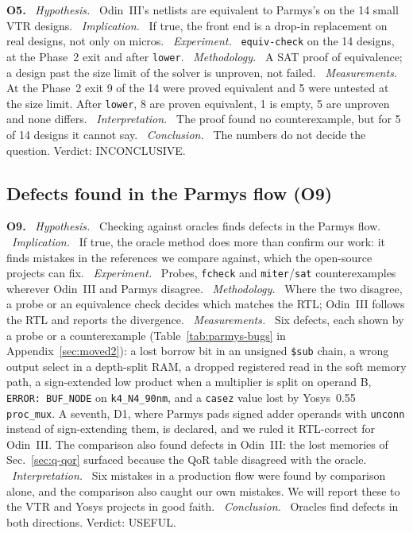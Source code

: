 \documentclass[conference]{IEEEtran}
\newcommand{\code}[1]{\texttt{#1}}
\newcommand{\argid}[1]{\par\smallskip\noindent\textbf{#1.}}
\newcommand{\ah}[1]{\ \textit{#1.}\ }
\begin{document}
\argid{O5}
\ah{Hypothesis} Odin~III's netlists are equivalent to Parmys's on the 14 small VTR designs.
\ah{Implication} If true, the front end is a drop-in replacement on real designs, not only on micros.
\ah{Experiment} \code{equiv-check} on the 14 designs, at the Phase~2 exit and after \code{lower}.
\ah{Methodology} A SAT proof of equivalence; a design past the size limit of the solver is unproven, not failed.
\ah{Measurements} At the Phase~2 exit 9 of the 14 were proved equivalent and 5 were untested at the size limit. After \code{lower}, 8 are proven equivalent, 1 is empty, 5 are unproven and none differs.
\ah{Interpretation} The proof found no counterexample, but for 5 of 14 designs it cannot say.
\ah{Conclusion} The numbers do not decide the question. Verdict: INCONCLUSIVE.

\subsection{Defects found in the Parmys flow (O9)}
\label{sec:parmys-bugs}

\argid{O9}
\ah{Hypothesis} Checking against oracles finds defects in the Parmys flow.
\ah{Implication} If true, the oracle method does more than confirm our work: it finds mistakes in the references we compare against, which the open-source projects can fix.
\ah{Experiment} Probes, \code{fcheck} and \code{miter}/\code{sat} counterexamples wherever Odin~III and Parmys disagree.
\ah{Methodology} Where the two disagree, a probe or an equivalence check decides which matches the RTL; Odin~III follows the RTL and reports the divergence.
\ah{Measurements} Six defects, each shown by a probe or a counterexample (Table~\ref{tab:parmys-bugs} in Appendix~\ref{sec:moved2}): a lost borrow bit in an unsigned \code{\$sub} chain, a wrong output select in a depth-split RAM, a dropped registered read in the soft memory path, a sign-extended low product when a multiplier is split on operand B, \code{ERROR: BUF\_NODE} on \code{k4\_N4\_90nm}, and a \code{casez} value lost by Yosys~0.55 \code{proc\_mux}. A seventh, D1, where Parmys pads signed adder operands with \code{unconn} instead of sign-extending them, is declared, and we ruled it RTL-correct for Odin~III. The comparison also found defects in Odin~III: the lost memories of Sec.~\ref{sec:q-qor} surfaced because the QoR table disagreed with the oracle.
\ah{Interpretation} Six mistakes in a production flow were found by comparison alone, and the comparison also caught our own mistakes. We will report these to the VTR and Yosys projects in good faith.
\ah{Conclusion} Oracles find defects in both directions. Verdict: USEFUL.
\end{document}
